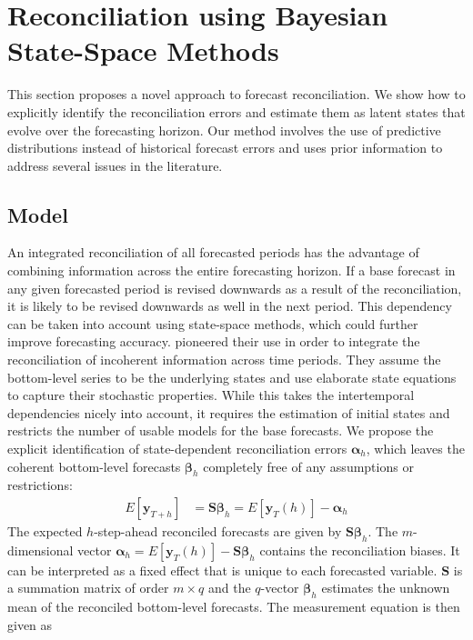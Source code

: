 \documentclass[a4paper,fleqn,11pt]{article}
\begin{document}
\section{Reconciliation using Bayesian State-Space Methods}\label{sec:model}

This section proposes a novel approach to forecast reconciliation. We show how to explicitly identify the reconciliation errors and estimate them as latent states that evolve over the forecasting horizon. Our method involves the use of predictive distributions instead of historical forecast errors and uses prior information to address several issues in the literature. 

\subsection{Model}
An integrated reconciliation of all forecasted periods has the advantage of combining information across the entire forecasting horizon. If a base forecast in any given forecasted period is revised downwards as a result of the reconciliation, it is likely to be revised downwards as well in the next period. This dependency can be taken into account using state-space methods, which could further improve forecasting accuracy. \cite{Pennings2017} pioneered their use in order to integrate the reconciliation of incoherent information across time periods. They assume the bottom-level series to be the underlying states and use elaborate state equations to capture their stochastic properties. While this takes the intertemporal dependencies nicely into account, it requires the estimation of initial states and restricts the number of usable models for the base forecasts. We propose the explicit identification of state-dependent reconciliation errors $\boldsymbol{\alpha}_h$, which leaves the coherent bottom-level forecasts $\boldsymbol{\beta}_h$ completely free of any assumptions or restrictions:
\begin{align}
	\label{eq:main}
	E\left[\textbf{y}_{T+h}\right] & = \textbf{S} \boldsymbol{\beta}_h = E\left[\mathbf{y}_{T}(h)\right] - \boldsymbol{\alpha}_h
\end{align}
The expected $h$-step-ahead reconciled forecasts are given by $\textbf{S} \boldsymbol{\beta}_h$.  The $m$-dimensional vector $\boldsymbol{\alpha}_h = E\left[\mathbf{y}_{T}(h)\right] - \textbf{S} \boldsymbol{\beta}_h$ contains the reconciliation biases. It can be interpreted as a fixed effect that is unique to each forecasted variable. $\textbf{S}$ is a summation matrix of order $m \times q$ and the $q$-vector $\boldsymbol{\beta}_h$ estimates the unknown mean of the reconciled bottom-level forecasts. The measurement equation is then given as
\end{document}
